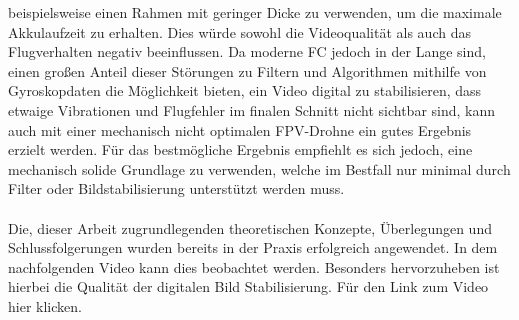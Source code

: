 beispielsweise einen Rahmen mit geringer Dicke zu verwenden, um die maximale Akkulaufzeit zu erhalten.
Dies würde sowohl die Videoqualität als auch das Flugverhalten negativ beeinflussen. Da moderne FC
jedoch in der Lange sind, einen großen Anteil dieser Störungen zu Filtern und Algorithmen mithilfe
von Gyroskopdaten die Möglichkeit bieten, ein Video digital zu stabilisieren, dass etwaige Vibrationen
und Flugfehler im finalen Schnitt nicht sichtbar sind, kann auch mit einer mechanisch nicht optimalen
FPV-Drohne ein gutes Ergebnis erzielt werden. Für das bestmögliche Ergebnis empfiehlt es sich jedoch,
eine mechanisch solide Grundlage zu verwenden, welche im Bestfall nur minimal durch Filter oder 
Bildstabilisierung unterstützt werden muss. \\
\\
Die, dieser Arbeit zugrundlegenden theoretischen Konzepte, Überlegungen und Schlussfolgerungen
wurden bereits in der Praxis erfolgreich angewendet. In dem nachfolgenden Video kann dies beobachtet
werden. Besonders hervorzuheben ist hierbei die Qualität der digitalen Bild Stabilisierung.
Für den Link zum Video hier klicken.